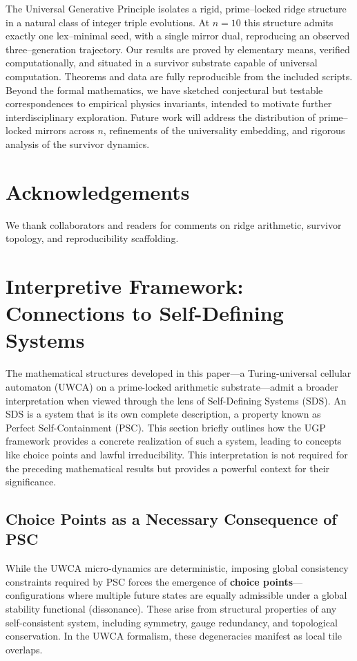 \documentclass[12pt]{article}
\numberwithin{equation}{section}
\begin{document}
The Universal Generative Principle isolates a rigid, prime--locked ridge structure in a natural class of integer triple evolutions.  At $n=10$ this structure admits exactly one lex--minimal seed, with a single mirror dual, reproducing an observed three--generation trajectory.  Our results are proved by elementary means, verified computationally, and situated in a survivor substrate capable of universal computation.  Theorems and data are fully reproducible from the included scripts.  Beyond the formal mathematics, we have sketched conjectural but testable correspondences to empirical physics invariants, intended to motivate further interdisciplinary exploration.  Future work will address the distribution of prime--locked mirrors across $n$, refinements of the universality embedding, and rigorous analysis of the survivor dynamics.

\section*{Acknowledgements}
We thank collaborators and readers for comments on ridge arithmetic, survivor topology, and reproducibility scaffolding.

\appendix
\section{Interpretive Framework: Connections to Self-Defining Systems}
\label{app:interpretive_framework}

The mathematical structures developed in this paper---a Turing-universal cellular automaton (UWCA) on a prime-locked arithmetic substrate---admit a broader interpretation when viewed through the lens of Self-Defining Systems (SDS). An SDS is a system that is its own complete description, a property known as Perfect Self-Containment (PSC). This section briefly outlines how the UGP framework provides a concrete realization of such a system, leading to concepts like choice points and lawful irreducibility. This interpretation is not required for the preceding mathematical results but provides a powerful context for their significance.

\subsection{Choice Points as a Necessary Consequence of PSC}

While the UWCA micro-dynamics are deterministic, imposing global consistency constraints required by PSC forces the emergence of \textbf{choice points}---configurations where multiple future states are equally admissible under a global stability functional (dissonance). These arise from structural properties of any self-consistent system, including symmetry, gauge redundancy, and topological conservation. In the UWCA formalism, these degeneracies manifest as local tile overlaps.
\end{document}
